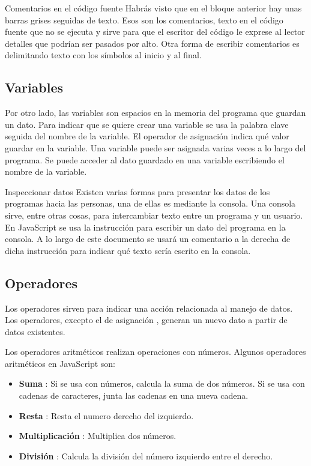\documentclass{article}
\newcommand{\code}[1]{\tcbox{\texttt{#1}}}
\newcommand{\codejs}[1]{\tcbox{\lstinline[style=ES6]{#1}}}
\newcommand{\operator}[2]{\item \textbf{#1} \codejs{#2}:}
\begin{document}
\begin{bclogo}[logo=\bcinfo, couleurBarre=orange, noborder=true, couleur=white]{Comentarios en el código fuente}
Habrás visto que en el bloque anterior hay unas barras grises \code{//} seguidas de texto. Esos son los comentarios, texto en el código fuente que no se ejecuta y sirve para que el escritor del código le exprese al lector detalles que podrían ser pasados por alto.
\newline
Otra forma de escribir comentarios es delimitando texto con los símbolos \code{/*} al inicio y \code{*/} al final.
\end{bclogo}

\subsection{Variables}
Por otro lado, las variables son espacios en la memoria del programa que guardan un dato. Para indicar que se quiere crear una variable se usa la palabra clave \codejs{let} seguida del nombre de la variable. El operador de asignación \codejs{=} indica qué valor guardar en la variable. Una variable puede ser asignada varias veces a lo largo del programa. Se puede acceder al dato guardado en una variable escribiendo el nombre de la variable.



\begin{bclogo}[logo=\bcinfo, couleurBarre=orange, noborder=true, couleur=white]{Inspeccionar datos}
Existen varias formas para presentar los datos de los programas hacia las personas, una de ellas es mediante la consola. Una consola sirve, entre otras cosas, para intercambiar texto entre un programa y un usuario. En JavaScript se usa la instrucción \codejs{console.log( /* dato */ )} para escribir un dato del programa en la consola. A lo largo de este documento se usará un comentario a la derecha de dicha instrucción para indicar qué texto sería escrito en la consola.
\end{bclogo}

\subsection{Operadores}
Los operadores sirven para indicar una acción relacionada al manejo de datos. Los operadores, excepto el de asignación \code{=}, generan un nuevo dato a partir de datos existentes.

\medskip
Los operadores aritméticos realizan operaciones con números. Algunos operadores aritméticos en JavaScript son:
\begin{itemize}
  \operator{Suma}{+} Si se usa con números, calcula la suma de dos números. Si se usa con cadenas de caracteres, junta las cadenas en una nueva cadena.
  \operator{Resta}{-} Resta el numero derecho del izquierdo.
  \operator{Multiplicación}{*} Multiplica dos números.
  \operator{División}{/} Calcula la división del número izquierdo entre el derecho.
\end{itemize}

\end{document}
